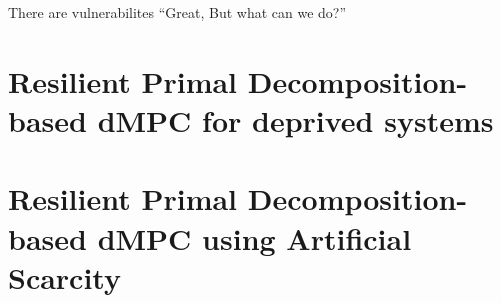 \documentclass[aspectratio=169]{beamer}
\begin{document}



\begin{frame}
  \begin{block}{There are vulnerabilites}
    \pause{}
    ``Great, But what can we do?''
  \end{block}
\end{frame}

\section{Resilient Primal Decomposition-based dMPC for deprived systems}
\section{Resilient Primal Decomposition-based dMPC using Artificial Scarcity}


\end{document}
